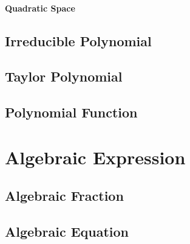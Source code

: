 \paragraph{Quadratic Space}\label{sec:quadratic_space}\hfill




\subsection{Irreducible Polynomial}\label{sec:irreducible_polynomial}

\subsection{Taylor Polynomial}\label{sec:taylor_polynomial}

\subsection{Polynomial Function}\label{sec:polynomial_function}



\section{Algebraic Expression}\label{sec:algebraic_expression}

\subsection{Algebraic Fraction}\label{sec:algebraic_fraction}

\subsection{Algebraic Equation}\label{sec:algebraic_equation}

